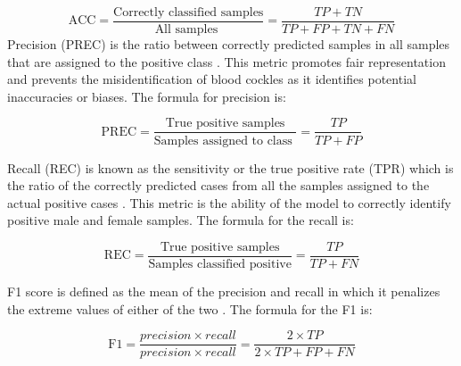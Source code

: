 \begin{equation}
	\text{ACC} = \frac{\text{Correctly classified samples}} {\text{All samples }} = \frac{TP+ TN}{TP + FP + TN + FN}
	\label{eq:acc}
\end{equation}
Precision (PREC) is the ratio between correctly predicted samples in all samples that are assigned to the positive class \cite{cui2020}. This metric promotes fair representation and prevents the misidentification of blood cockles as it identifies potential inaccuracies or biases. The formula for precision is:


\begin{equation}
	\text{PREC} = \frac{\text{True positive samples}} {\text{Samples assigned to class }} = \frac{TP}{TP + FP}
	\label{eq:prec}
\end{equation}

Recall (REC) is known as the sensitivity or the true positive rate (TPR) which is the ratio of the correctly predicted cases from all the samples assigned to the actual positive cases \cite{cui2020}. This metric is the ability of the model to correctly identify positive male and female samples. The formula for the recall is:

\begin{equation}
	\text{REC} = \frac{\text{True positive samples}} {\text{Samples classified positive}} = \frac{TP}{TP + FN}
	\label{eq:rec}
\end{equation}

F1 score is defined as the mean of the precision and recall in which it penalizes the extreme values of either of the two \cite{cui2020}. The formula for the F1 is: 

\begin{equation}
	\text{F1} = \frac{ precision \times recall }{precision \times recall }= \frac{2 \times TP}{2 \times TP + FP + FN}
	\label{eq:f1}
\end{equation}




